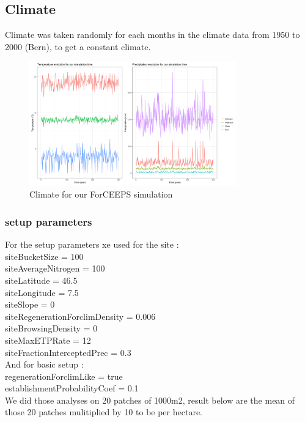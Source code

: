\documentclass{article}
\begin{document}
\subsection{Climate}

Climate was taken randomly for each months in the climate data from 1950 to 2000 (Bern), to get a constant climate.

\begin{figure}[H]
    \centering
    \includegraphics[width=0.8\textwidth]{Figure/Climate_simul.png}
    \caption{Climate for our ForCEEPS simulation}
    \label{fig:my_label}
\end{figure}

\subsubsection{setup parameters}

For the setup parameters xe used for the site : \\
siteBucketSize = 100 \\
siteAverageNitrogen = 100 \\
siteLatitude = 46.5 \\
siteLongitude = 7.5 \\
siteSlope = 0 \\
siteRegenerationForclimDensity = 0.006 \\
siteBrowsingDensity = 0 \\
siteMaxETPRate = 12 \\
siteFractionInterceptedPrec = 0.3 \\

And for basic setup :\\
regenerationForclimLike = true \\
establishmentProbabilityCoef = 0.1 \\

We did those analyses on 20 patches of 1000m2, result below are the mean of those 20 patches mulitiplied by 10 to be per hectare.
\end{document}

